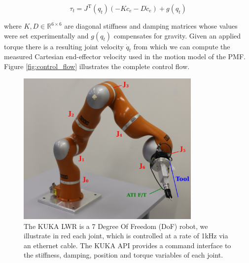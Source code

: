 \begin{equation}\label{eq:torque_control}
 \tau_t = J^{\mathrm{T}}(q_t)\left(-K c_e - D \dot{c}_e \right) + g(q_t)
\end{equation}

where $K,D \in \mathbb{R}^{6\times6}$ are diagonal stiffness and damping matrices whose values were set experimentally 
and $g(q_t)$ compensates for gravity. Given an applied torque there is a resulting joint velocity $\dot{q}_t$ from which we can compute the measured Cartesian end-effector velocity used in the motion model of the PMF.
Figure \ref{fig:control_flow} illustrates the complete control flow.

\begin{figure}
 \centering
 \includegraphics[width=0.8\textwidth]{./ch4-PiH/Figures/kuka.pdf}
 \caption{The KUKA LWR is a 7 Degree Of Freedom (DoF) robot, we illustrate in red each joint, which is controlled at a rate of 1kHz via an ethernet cable. The KUKA API provides a command interface to the 
 stiffness, damping, position and torque variables of each joint.}
 \label{fig:kuka}
\end{figure}


